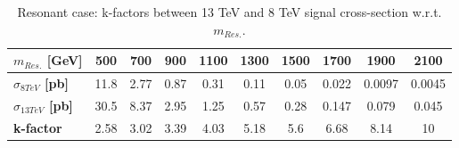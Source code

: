 \documentclass[10pt]{article}
\begin{document}
\begin{table}[!ht]
\begin{center}
\begin{tabular}{|l|c|c|c|c|c|c|c|c|c|}
\hline
\hline
\textbf{$m_{Res.}$ [GeV]}          & \textbf{500} & \textbf{700} & \textbf{900} & \textbf{1100} & \textbf{1300} & \textbf{1500} & \textbf{1700} & \textbf{1900} & \textbf{2100} \\
\hline
\textbf{ $\sigma_{ 8  TeV}$ [pb]}  & 11.8         & 2.77         & 0.87         & 0.31          & 0.11          & 0.05          & 0.022         & 0.0097        & 0.0045        \\
\textbf{ $\sigma_{ 13 TeV}$ [pb]}  & 30.5         & 8.37         & 2.95         & 1.25          & 0.57          & 0.28          & 0.147         & 0.079         & 0.045         \\
\hline                                                                     
\textbf{ k-factor}                 & 2.58         & 3.02         & 3.39         & 4.03          & 5.18          & 5.6           & 6.68          & 8.14          & 10            \\
\hline                                                                     
\hline                                                                     
\hline
\end{tabular}
\caption{Resonant case: k-factors between 13 TeV and 8 TeV signal cross-section w.r.t. $m_{Res.}$.}
\label{tab:SFtable}
\end{center}
\end{table} 
\end{document}
